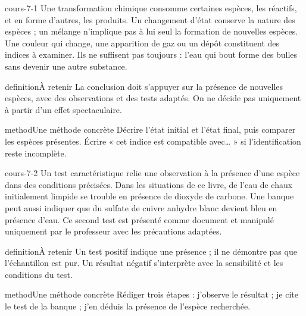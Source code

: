 \documentclass[12pt,twoside,openany]{book}
\begin{document}
\begin{pcFiche}{cours-7-1}
Une transformation chimique consomme certaines espèces, les réactifs, et en forme d’autres, les produits. Un changement d’état conserve la nature des espèces ; un mélange n’implique pas à lui seul la formation de nouvelles espèces. Une couleur qui change, une apparition de gaz ou un dépôt constituent des indices à examiner. Ils ne suffisent pas toujours : l’eau qui bout forme des bulles sans devenir une autre substance.\par
{}
\begin{pcEncadre}{definition}{À retenir}
La conclusion doit s’appuyer sur la présence de nouvelles espèces, avec des observations et des tests adaptés. On ne décide pas uniquement à partir d’un effet spectaculaire.\par
\end{pcEncadre}
\begin{pcEncadre}{method}{Une méthode concrète}
Décrire l’état initial et l’état final, puis comparer les espèces présentes. Écrire « cet indice est compatible avec… » si l’identification reste incomplète.\par
\end{pcEncadre}
\end{pcFiche}
\label{ch-7-cours-2}
\begin{pcFiche}{cours-7-2}
Un test caractéristique relie une observation à la présence d’une espèce dans des conditions précisées. Dans les situations de ce livre, de l’eau de chaux initialement limpide se trouble en présence de dioxyde de carbone. Une banque peut aussi indiquer que du sulfate de cuivre anhydre blanc devient bleu en présence d’eau. Ce second test est présenté comme document et manipulé uniquement par le professeur avec les précautions adaptées.\par
{}
\begin{pcEncadre}{definition}{À retenir}
Un test positif indique une présence ; il ne démontre pas que l’échantillon est pur. Un résultat négatif s’interprète avec la sensibilité et les conditions du test.\par
\end{pcEncadre}
\begin{pcEncadre}{method}{Une méthode concrète}
Rédiger trois étapes : j’observe le résultat ; je cite le test de la banque ; j’en déduis la présence de l’espèce recherchée.\par
\end{pcEncadre}
\end{pcFiche}
\end{document}
